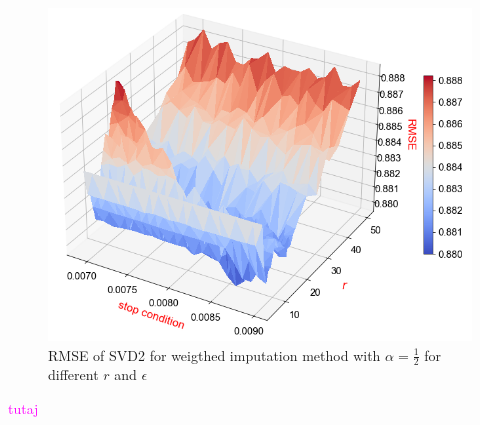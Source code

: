 \documentclass[11pt]{amsart}
\newcommand{\tami}[1]{{\textcolor{magenta}{#1}}}
\begin{document}
\begin{figure}[H]
    \includegraphics[scale=0.55]{svd2_stop2}
    \caption{RMSE of SVD2 for weigthed imputation method with $\alpha = \frac{1}{2}$ for different $r$ and $\epsilon$}
\end{figure}

\tami{tutaj}
\end{document}
